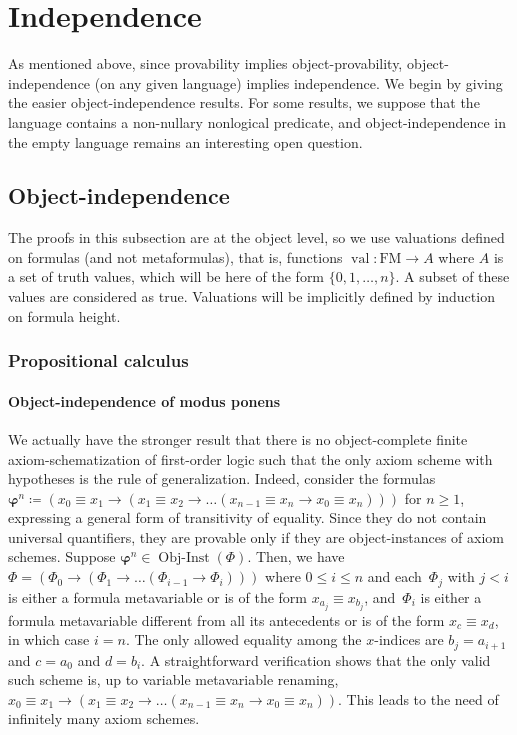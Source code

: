 \documentclass[11pt]{article}
\renewcommand*{\phi}{\varphi}
\newcommand*{\FM}{\mathrm{FM}}
\DeclareMathOperator{\val}{val}
\theoremstyle{plain}
\theoremstyle{definition}
\theoremstyle{remark}
\begin{document}
\section{Independence}
\label{sec:indep}

As mentioned above, since provability implies object-provability, object-independence (on any
given language) implies independence.
We begin by giving the easier object-independence results.
For some results, we suppose that the language contains a non-nullary nonlogical predicate, and
object-independence in the empty language remains an interesting open question.



\subsection{Object-independence}

The proofs in this subsection are at the object level, so we use valuations defined on formulas (and
not metaformulas), that is, functions $\val \colon \FM \to A$ where $A$ is a set of truth values,
which will be here of the form $\{0, 1, \ldots, n\}$.
A subset of these values are considered as true.
Valuations will be implicitly defined by induction on formula height.


\subsubsection{Propositional calculus}

\paragraph{Object-independence of modus ponens}

We actually have the stronger result that there is no object-complete finite axiom-schematization of
first-order logic such that the only axiom scheme with hypotheses is the rule of generalization.
Indeed, consider the formulas
$\bm\phi^n \coloneqq
(x_0 \equiv x_1 \to (x_1 \equiv x_2 \to \ldots (x_{n-1} \equiv x_n \to x_0 \equiv x_n)))$
for $n \geq 1$, expressing a general form of transitivity of equality.
Since they do not contain universal quantifiers, they are provable only if they are
object-instances of axiom schemes.
Suppose $\bm\phi^n \in \operatorname{Obj-Inst}(\Phi)$.
Then, we have $\Phi = (\Phi_0 \to (\Phi_1 \to \ldots (\Phi_{i-1} \to \Phi_i)))$ where
$0 \leq i \leq n $ and each~$\Phi_j$ with
$j < i$ is either a formula metavariable or is of the form $x_{a_j} \equiv x_{b_j}$, and~$\Phi_i$
is either a formula metavariable different from all its antecedents or is of the form
$x_c \equiv x_d$, in which case $i = n$.
The only allowed equality among the $x$-indices are $b_j = a_{i+1}$ and $c = a_0$ and $d = b_i$.
A straightforward verification shows that the only valid such scheme is, up to variable
metavariable renaming,
$x_0 \equiv x_1 \to (x_1 \equiv x_2 \to \ldots (x_{n-1} \equiv x_n \to x_0 \equiv x_n))$.
This leads to the need of infinitely many axiom schemes.
\end{document}
